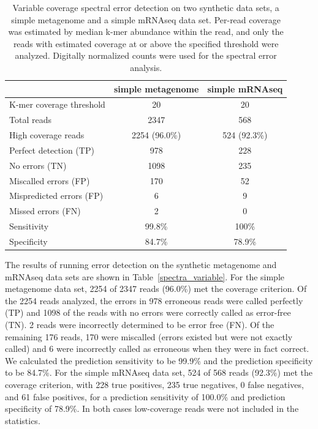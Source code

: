\documentclass{article}
\begin{document}

\begin{table}
\begin{tabular}{|l|c||c|}
\hline
& simple metagenome & simple mRNAseq \\
\hline
K-mer coverage threshold & 20 & 20 \\
Total reads & 2347 & 568 \\
High coverage reads & 2254 (96.0\%) & 524 (92.3\%) \\
\hline
Perfect detection (TP) & 978 & 228 \\
No errors (TN) & 1098 & 235 \\
Miscalled errors (FP) & 170 & 52 \\
Mispredicted errors (FP) & 6 & 9 \\
Missed errors (FN) & 2 & 0 \\
\hline
Sensitivity & 99.8\% & 100\% \\
Specificity & 84.7\% & 78.9\% \\
\hline
\end{tabular}
\label{tab:spectra_variable}

\caption{Variable coverage spectral error detection on two synthetic
  data sets, a simple metagenome and a simple mRNAseq data set.
  Per-read coverage was estimated by median k-mer abundance within the
  read, and only the reads with estimated coverage at or above the
  specified threshold were analyzed.  Digitally normalized counts were
  used for the spectral error analysis.}
\end{table}

The results of running error detection on the synthetic metagenome and
mRNAseq data sets are shown in Table~\ref{spectra_variable}. For the
simple metagenome data set, 2254 of 2347 reads (96.0\%) met the
coverage criterion.  Of the 2254 reads analyzed, the errors in 978
erroneous reads were called perfectly (TP) and 1098 of the reads with
no errors were correctly called as error-free (TN).  2 reads were
incorrectly determined to be error free (FN).  Of the remaining 176
reads, 170 were miscalled (errors existed but were not exactly called)
and 6 were incorrectly called as erroneous when they were in fact
correct.  We calculated the prediction sensitivity to be 99.9\% and
the prediction specificity to be 84.7\%.  For the simple mRNAseq data
set, 524 of 568 reads (92.3\%) met the coverage criterion, with 228
true positives, 235 true negatives, 0 false negatives, and 61 false
positives, for a prediction sensitivity of 100.0\% and prediction
specificity of 78.9\%.  In both cases low-coverage reads were not
included in the statistics.
\end{document}
